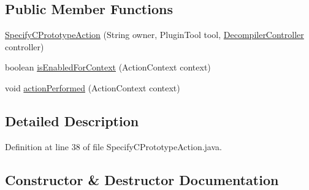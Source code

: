 \subsection*{Public Member Functions}
\begin{DoxyCompactItemize}
\item 
\mbox{\hyperlink{classghidra_1_1app_1_1plugin_1_1core_1_1decompile_1_1actions_1_1_specify_c_prototype_action_a50c8401c4497aa4c9e17d88ba6a36337}{Specify\+C\+Prototype\+Action}} (String owner, Plugin\+Tool tool, \mbox{\hyperlink{classghidra_1_1app_1_1decompiler_1_1component_1_1_decompiler_controller}{Decompiler\+Controller}} controller)
\item 
boolean \mbox{\hyperlink{classghidra_1_1app_1_1plugin_1_1core_1_1decompile_1_1actions_1_1_specify_c_prototype_action_aca5c2f99385a711365f7a32c1888f313}{is\+Enabled\+For\+Context}} (Action\+Context context)
\item 
void \mbox{\hyperlink{classghidra_1_1app_1_1plugin_1_1core_1_1decompile_1_1actions_1_1_specify_c_prototype_action_a5b2869ac2f0cc8c72473a5ebb5b15f6c}{action\+Performed}} (Action\+Context context)
\end{DoxyCompactItemize}


\subsection{Detailed Description}


Definition at line 38 of file Specify\+C\+Prototype\+Action.\+java.



\subsection{Constructor \& Destructor Documentation}
\mbox{\label{classghidra_1_1app_1_1plugin_1_1core_1_1decompile_1_1actions_1_1_specify_c_prototype_action_a50c8401c4497aa4c9e17d88ba6a36337}} 
